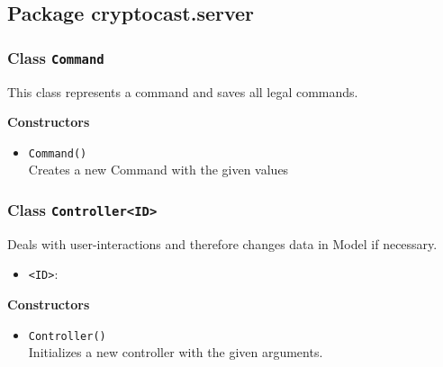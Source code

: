 \subsection{Package cryptocast.server}
\subsubsection{Class \lstinline|Command|}
This class represents a command and saves all legal commands.

\textbf{Constructors}
\begin{itemize}
\item \lstinline|Command()| \\
Creates a new Command with the given values

\end{itemize}


\subsubsection{Class \lstinline|Controller<ID>|}
Deals with user-interactions and therefore changes data in Model if necessary.
\begin{itemize}
\item \lstinline|<ID>|: 
\end{itemize}

\textbf{Constructors}
\begin{itemize}
\item \lstinline|Controller()| \\
Initializes a new controller with the given arguments.

\end{itemize}

